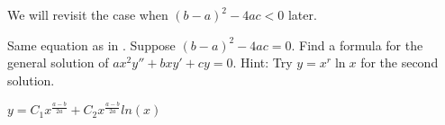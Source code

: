 We will revisit the case when ${(b-a)}^2-4ac < 0$ later.

\begin{exercise} \label{sol:eulerexln}
Same equation as in .
Suppose ${(b-a)}^2-4ac = 0$.  Find a formula for the general solution
of $a x^2 y'' + b x y' + c y = 0$.  Hint: Try $y=x^r \ln x$ for the second
solution.
\end{exercise}
\comboSol{%
}
{%
$y = C_1x^{\frac{a-b}{2a}} + C_2x^{\frac{a-b}{2a}}ln(x)$
}


\setcounter{exercise}{100}



